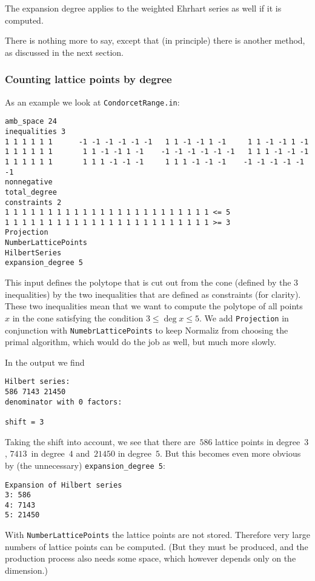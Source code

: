 The expansion degree applies to the weighted Ehrhart series as well if it is computed.

There is nothing more to say, except that (in principle) there is another method, as discussed in the next section.

\subsubsection{Counting lattice points by degree}\label{count}

As an example we look at \verb|CondorcetRange.in|:
\begin{Verbatim}
amb_space 24
inequalities 3
1 1 1 1 1 1      -1 -1 -1 -1 -1 -1   1 1 -1 -1 1 -1     1 1 -1 -1 1 -1
1 1 1 1 1 1       1 1 -1 -1 1 -1    -1 -1 -1 -1 -1 -1   1 1 1 -1 -1 -1
1 1 1 1 1 1       1 1 1 -1 -1 -1     1 1 1 -1 -1 -1    -1 -1 -1 -1 -1 -1
nonnegative
total_degree
constraints 2
1 1 1 1 1 1 1 1 1 1 1 1 1 1 1 1 1 1 1 1 1 1 1 1 <= 5
1 1 1 1 1 1 1 1 1 1 1 1 1 1 1 1 1 1 1 1 1 1 1 1 >= 3
Projection
NumberLatticePoints
HilbertSeries
expansion_degree 5
\end{Verbatim}
This input defines the polytope that is cut out from the cone (defined by the $3$ inequalities) by the two inequalities that are defined as constraints (for clarity). These two inequalities mean that we want to compute the polytope of all points $x$ in the cone satisfying the condition $3\le \deg x \le 5$. We add \verb|Projection| in conjunction with \verb|NumebrLatticePoints| to keep Normaliz from choosing the primal algorithm, which would do the job as well, but much more slowly.

In the output we find
\begin{Verbatim}
Hilbert series:
586 7143 21450 
denominator with 0 factors:

shift = 3
\end{Verbatim}

Taking the shift into account, we see that there are~$586$ lattice points in degree~$3$, $7413$~in degree~$4$ and~$21450$ in degree~$5$. But this becomes even more obvious by (the unnecessary) \verb|expansion_degree 5|:
\begin{Verbatim}
Expansion of Hilbert series
3: 586
4: 7143
5: 21450
\end{Verbatim}
With \verb|NumberLatticePoints| the lattice points are not stored. Therefore very large numbers of lattice points can be computed. (But they must be produced, and the production process also needs some space, which however depends only on the dimension.)

